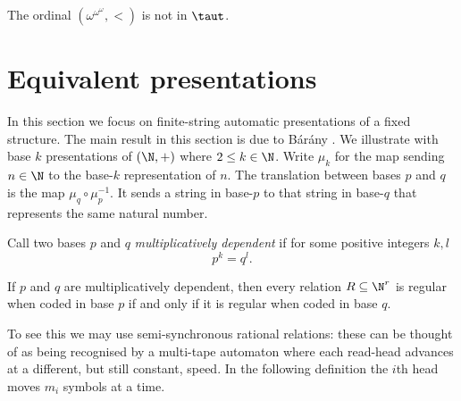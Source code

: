 \begin{corollary}
The ordinal $(\omega^{\omega^{\omega}},<)$ is not in $\taut$.
\end{corollary}


\section{Equivalent presentations} \label{AS:sec:equiv}

In this section we focus on finite-string automatic presentations of a fixed structure. The main result in this section is due to B{\'a}r{\'a}ny \cite{Bara06}. We illustrate with base $k$ presentations of
$(\N,+)$ where $2 \leq k \in \N$. Write $\mu_k$ for the map sending $n \in \N$ to the base-$k$ representation of $n$.
The translation between bases $p$ and $q$ is the map $\mu_q \circ \mu_p^{-1}$. It sends a string in base-$p$ to that
string in base-$q$ that represents the same natural number.

Call two bases $p$ and $q$ {\em multiplicatively dependent} if for some positive integers
$k,l$
\[
 p^k = q^l.
\]


\begin{proposition} \label{AS:prop:multdep}
If $p$ and $q$ are multiplicatively dependent, then every relation $R \subseteq \N^r$
is regular when coded in base $p$ if and only if it is regular when coded in base $q$.
\end{proposition}

To see this we may use semi-synchronous rational relations: these can be thought of as being
recognised by a multi-tape automaton where each read-head advances at a
different, but still constant, speed. In the following definition the $i$th head moves $m_i$ symbols at a time.


